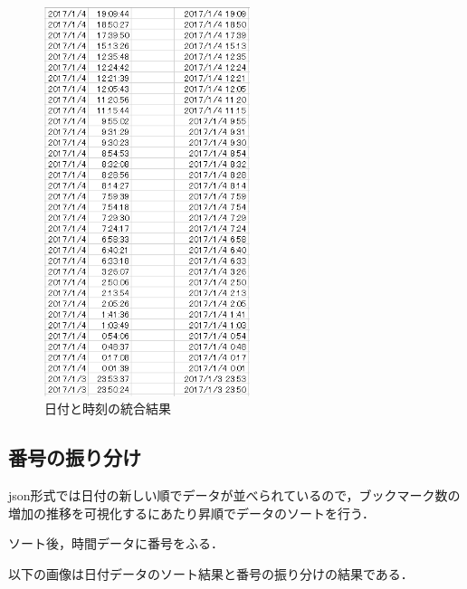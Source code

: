 \begin{figure}[htb]
\centering
\includegraphics[width=6cm]{excel2.PNG}
\caption{日付と時刻の統合結果}\label{excel2}
\end{figure}

\newpage

\subsection{番号の振り分け}
json形式では日付の新しい順でデータが並べられているので，ブックマーク数の増加の推移を可視化するにあたり昇順でデータのソートを行う．\par
ソート後，時間データに番号をふる．\par
以下の画像は日付データのソート結果と番号の振り分けの結果である．

